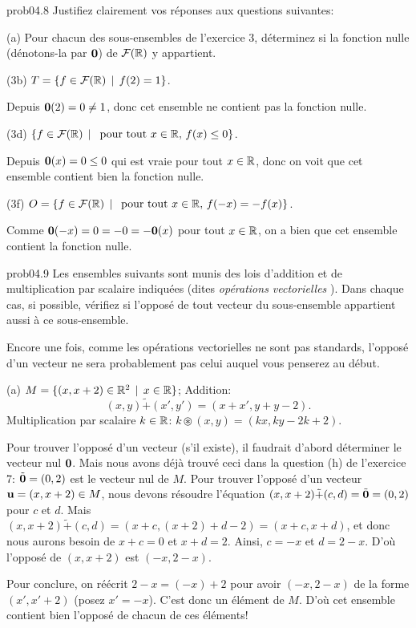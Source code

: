 \bigskip
\begin{sol}{prob04.8} Justifiez clairement vos
réponses aux questions suivantes:

\medskip
(a) Pour chacun des sous-ensembles de l'exercice 3, déterminez si la fonction nulle (dénotons-la par $\mathbf{0}$) de
$\mathcal{F}(\mathbb{R})$ y appartient.

\medskip
(3b) $T=\{f \in \mathcal{F}(\mathbb{R}) \, \mid \, f(2)=1 \}$.

\soln Depuis ${\bf 0}(2)=0\not=1$, donc cet ensemble ne contient pas la fonction
nulle.

\medskip
(3d) $\{f \in \mathcal{F}(\mathbb{R}) \, \mid \, \text{ pour tout } x\in \mathbb{R},   \, f(x)\le 0\}$.

\soln Depuis ${\bf 0}(x) = 0 \le 0$ qui est vraie pour tout $x\in \mathbb{R}$, donc on voit que cet ensemble
contient bien la fonction nulle.

\medskip
(3f) $O=\{f \in \mathcal{F}(\mathbb{R}) \, \mid \, \text{ pour tout } x\in \mathbb{R},   \, f(-x)= -f(x)\}$.

\soln Comme ${\bf 0}(-x) = 0=-0=-{\bf 0}(x)$ pour tout $x\in \mathbb{R}$, on a bien que cet
ensemble contient la fonction nulle.
\medskip
\end{sol}

\bigskip
\begin{sol}{prob04.9} Les ensembles
suivants sont munis des lois d'addition et de
multiplication par scalaire indiquées (dites {\emph{ opérations vectorielles } }).  Dans chaque cas, si
possible, vérifiez si l'opposé de tout vecteur du sous-ensemble appartient aussi à ce sous-ensemble.

Encore une fois, comme les opérations vectorielles ne sont pas standards, l'opposé d'un vecteur ne sera probablement pas
celui auquel vous penserez au début.

\medskip
(a) $M=\{(x, x+2) \in \mathbb{R}^2\, \mid \, x\in \mathbb{R}\}$; Addition:
\[(x,y) \tilde+ (x',y')=(x+x', y+y-2).\] Multiplication par
scalaire $k\in \mathbb{R}$: $k\circledast (x,y)=(kx, ky-2k+2)$.

\soln Pour trouver l'oppos\'e d'un vecteur (s'il existe), il faudrait d'abord d\'eterminer le vecteur nul $\mathbf{0}$. Mais nous avons déjà trouvé ceci dans la question (h) de l'exercice 7: $\tilde {\mathbf{0}}=(0,2)$ est
le vecteur nul de $M$. Pour trouver l'oppos\'e d'un vecteur
$\mathbf{u}=(x,x+2) \in M$, nous devons résoudre l'équation
$(x,x+2) \tilde+ (c,d)= \tilde {\mathbf{0}}=(0,2)$ pour $c$ et $d$. Mais
$(x,x+2) \tilde+ (c,d)=(x+c, (x+2) +d-2)=(x+c, x+d)$, et donc nous aurons
besoin de $x+c=0$ et $x+d=2$. Ainsi, $c=-x$ et $d=2-x$. D'o\`u l'oppos\'e de $(x, x+2)$ est $(-x, 2-x)$.

Pour conclure, on r\'e\'ecrit $2-x =(-x)+2$ pour avoir $(-x, 2-x)$ de la forme $(x', x'+2)$ (posez $x'=-x$). C'est donc un élément de $M$. D'o\`u cet ensemble contient bien l'oppos\'e de chacun de ces éléments!
\medskip
\end{sol}

